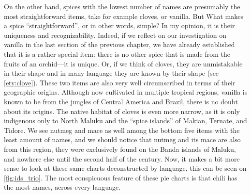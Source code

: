 On the other hand, spices with the lowest number of names are presumably the most straightforward items, take for example cloves, or vanilla. But What makes a spice ``straightforward'', or in other words, simple? In my opinion, it is their uniqueness and recognizability. Indeed, if we reflect on our investigation on vanilla in the last section of the previous chapter, we have already established that it is a rather special item: there is no other spice that is made from the fruits of an orchid---it is unique. Or, if we think of cloves, they are unmistakable in their shape and in many language they are known by their shape (see \ref{ety:clove}). These two items are also very well circumscribed in terms of their geographic origins. Although now cultivated in multiple tropical regions, vanilla is known to be from the jungles of Central America and Brazil, there is no doubt about its origins. The native habitat of cloves is even more narrow, as it is only indigenous only to North Maluku and the ``spice islands'' of Makian, Ternate, and Tidore. We see nutmeg and mace as well among the bottom five items with the least amount of names, and we should notice that nutmeg and its mace are also from this region, they were exclusively found on the Banda islands of Maluku, and nowhere else until the second half of the  century. Now, it makes a bit more sense to look at these same charts deconstructed by language, this can be seen on \cref{fig:ids_trio}. The most conspicuous feature of these pie charts is that chili has the most names, across every language.


